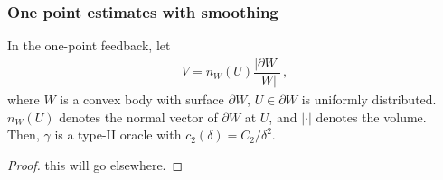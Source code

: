 
\subsubsection*{One point estimates with smoothing}
\begin{proposition}
\label{prop:flaxman}
In the one-point feedback, let
\begin{align*}
V = n_W(U)\dfrac{\lvert \partial W\rvert}{\lvert W \rvert}\,,
\end{align*}
where $W$ is a convex body with surface $\partial W$, $U \in \partial W$ is uniformly distributed. $n_W(U)$ denotes the normal vector of $\partial W$ at $U$, and $\lvert \cdot \rvert$ denotes the volume. Then, $\gamma$ is a type-II oracle with $c_2(\delta) = C_2/\delta^2$.
\end{proposition}
\begin{proof}
this will go elsewhere.
\end{proof}


